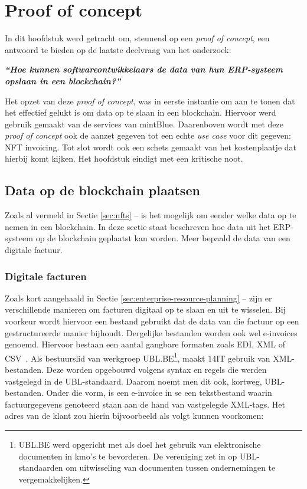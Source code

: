 \chapter{Proof of concept}
\label{ch:proof-of-concept}



In dit hoofdstuk werd getracht om, steunend op een \textit{proof of concept}, een antwoord te bieden op de laatste deelvraag van het onderzoek:

\begin{center}
	\textit{\textbf{``Hoe kunnen softwareontwikkelaars de data van hun ERP-systeem opslaan in een blockchain?''}}
\end{center}

Het opzet van deze \textit{proof of concept}, was in eerste instantie om aan te tonen dat het effectief gelukt is om data op te slaan in een blockchain. Hiervoor werd gebruik gemaakt van de services van mintBlue. Daarenboven wordt met deze \textit{proof of concept} ook de aanzet gegeven tot een echte \textit{use case} voor dit gegeven: NFT invoicing. Tot slot wordt ook een schets gemaakt van het kostenplaatje dat hierbij komt kijken. Het hoofdstuk eindigt met een kritische noot.


\section{Data op de blockchain plaatsen}
\label{sec:data-op-de-blockchain-plaatsen}

Zoals al vermeld in Sectie \ref{sec:nfts} --  is het mogelijk om eender welke data op te nemen in een blockchain. In deze sectie staat beschreven hoe data uit het ERP-systeem op de blockchain geplaatst kan worden. Meer bepaald de data van een digitale factuur.

\subsection{Digitale facturen}
\label{sub:digitale-facturen}

Zoals kort aangehaald in Sectie \ref{sec:enterprise-resource-planning} --  zijn er verschillende manieren om facturen digitaal op te slaan en uit te wisselen.
Bij voorkeur wordt hiervoor een bestand gebruikt dat de data van die factuur op een gestructureerde manier bijhoudt. Dergelijke bestanden worden ook wel e-invoices genoemd. Hiervoor bestaan een aantal gangbare formaten zoals EDI, XML of CSV~\autocite{Damsgaard2000}. Als bestuurslid van werkgroep UBL.BE\footnote{UBL.BE werd opgericht met als doel het gebruik van elektronische documenten in kmo's te bevorderen. De vereniging zet in op UBL-standaarden om uitwisseling van documenten tussen ondernemingen te vergemakkelijken.}, maakt 14IT gebruik van XML-bestanden. Deze worden opgebouwd volgens syntax en regels die werden vastgelegd in de UBL-standaard. Daarom noemt men dit ook, kortweg, UBL-bestanden. Onder die vorm, is een e-invoice in se een tekstbestand waarin factuurgegevens genoteerd staan aan de hand van vastgelegde XML-tags. Het adres van de klant zou hierin bijvoorbeeld als volgt kunnen voorkomen:

